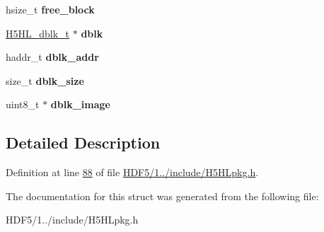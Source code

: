 \begin{DoxyCompactItemize}
\item 
\mbox{\label{struct_h5_h_l__t_a17f28a6d5dd79449bf8f012df66ca5f3}} 
hsize\+\_\+t {\bfseries free\+\_\+block}
\item 
\mbox{\label{struct_h5_h_l__t_a37cfbb18362c6fc87efdada7a7f7c452}} 
\hyperlink{struct_h5_h_l__dblk__t}{H5\+H\+L\+\_\+dblk\+\_\+t} $\ast$ {\bfseries dblk}
\item 
\mbox{\label{struct_h5_h_l__t_a0295c073388606d2ec0cd33a76c30bd2}} 
haddr\+\_\+t {\bfseries dblk\+\_\+addr}
\item 
\mbox{\label{struct_h5_h_l__t_a243790a06a935cdbba6f7c1fd2c2adc6}} 
size\+\_\+t {\bfseries dblk\+\_\+size}
\item 
\mbox{\label{struct_h5_h_l__t_a469c96a11db88d0720e6896f4ed413c1}} 
uint8\+\_\+t $\ast$ {\bfseries dblk\+\_\+image}
\end{DoxyCompactItemize}


\subsection{Detailed Description}


Definition at line \hyperlink{_h_d_f5_21_810_81_2include_2_h5_h_lpkg_8h_source_l00088}{88} of file \hyperlink{_h_d_f5_21_810_81_2include_2_h5_h_lpkg_8h_source}{H\+D\+F5/1../include/\+H5\+H\+Lpkg.\+h}.



The documentation for this struct was generated from the following file\+:\begin{DoxyCompactItemize}
\item 
H\+D\+F5/1../include/\+H5\+H\+Lpkg.\+h\end{DoxyCompactItemize}
